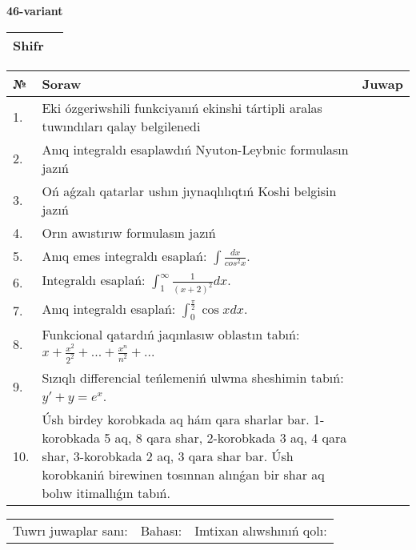 \documentclass{article}
\begin{document}
  \egroup
  
  \newpage
  
  
  \textbf{46-variant}\\
  
  \bgroup
  \def\arraystretch{1.6} %
  
  \begin{tabular}{|m{5.7cm}|m{9.5cm}|}
  \hline
  Shifr & \\
  \hline
  \end{tabular}
  
  \vspace{1cm}
  
  \begin{tabular}{|m{0.7cm}|m{10cm}|m{4cm}|}
  \hline
  № & Soraw & Juwap \\
  \hline
  1. & Eki ózgeriwshili funkciyanıń ekinshi tártipli aralas tuwındıları qalay belgilenedi &  \\
  \hline
  2. & Anıq integraldı esaplawdıń Nyuton-Leybnic formulasın jazıń &  \\
  \hline
  3. & Oń aǵzalı qatarlar ushın jıynaqlılıqtıń Koshi belgisin jazıń &  \\
  \hline
  4. & Orın awıstırıw formulasın jazıń &  \\
  \hline
  5. & Anıq emes integraldı esaplań: \(\int\frac{dx}{cos^2 x}\). &  \\
  \hline
  6. & Integraldı esaplań: \(\int_{1}^{\infty}{\frac{1}{(x + 2)^2 }dx}\). &  \\
  \hline
  7. & Anıq integraldı esaplań: \(\int_{0}^{\frac{\pi}{2}}{\cos xdx}\). &  \\
  \hline
  8. & Funkcional qatardıń jaqınlasıw oblastın tabıń: \(x + \frac{x^2 }{2^2 } + ... + \frac{x^{n}}{n^2 } + ...\) &  \\
  \hline
  9. & Sızıqlı differencial teńlemeniń ulwma sheshimin tabıń: \(y' + y = e^{x}\). &  \\
  \hline
  10. & Úsh birdey korobkada aq hám qara sharlar bar. 1-korobkada 5 aq, 8 qara shar, 2-korobkada 3 aq, 4 qara shar, 3-korobkada 2 aq, 3 qara shar bar. Úsh korobkaniń birewinen tosınnan alınǵan bir shar aq bolıw itimallıǵın tabıń. &  \\
  \hline
  \end{tabular}
  
  \vspace{1cm}
  
  \begin{tabular}{lll}
  Tuwrı juwaplar sanı: \underline{\hspace{1.5cm}} & 
  Bahası: \underline{\hspace{1.5cm}} & 
  Imtixan alıwshınıń qolı: \underline{\hspace{2cm}} \\
  \end{tabular}
  
\end{document}
